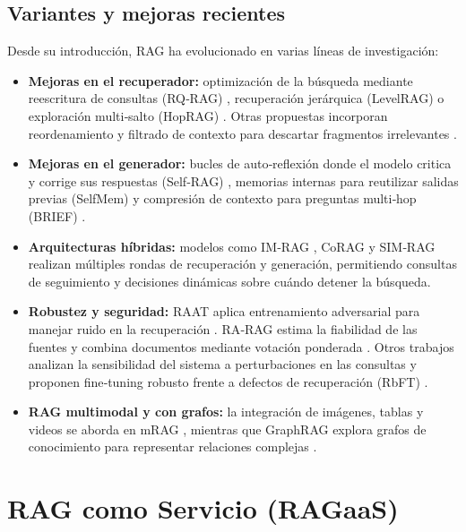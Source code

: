 \subsection{Variantes y mejoras recientes}

Desde su introducción, RAG ha evolucionado en varias líneas de investigación:

\begin{itemize}
  \item \textbf{Mejoras en el recuperador:} optimización de la búsqueda mediante reescritura de consultas (RQ‑RAG) \cite{Chan2024RQ-RAG}, recuperación jerárquica (LevelRAG) \cite{Zhang2025LevelRAG} o exploración multi‑salto (HopRAG) \cite{Wang2025HopRAG}. Otras propuestas incorporan reordenamiento y filtrado de contexto para descartar fragmentos irrelevantes \cite{Wang2023FILCO}.
  \item \textbf{Mejoras en el generador:} bucles de auto‑reflexión donde el modelo critica y corrige sus respuestas (Self‑RAG) \cite{Asai2023SelfRAG}, memorias internas para reutilizar salidas previas (SelfMem) \cite{Cheng2023SelfMem} y compresión de contexto para preguntas multi‑hop (BRIEF) \cite{Li2025BRIEF}.
  \item \textbf{Arquitecturas híbridas:} modelos como IM‑RAG \cite{Yang2024IM-RAG}, CoRAG \cite{Wang2025CoRAG} y SIM‑RAG \cite{Yang2025SIM-RAG} realizan múltiples rondas de recuperación y generación, permitiendo consultas de seguimiento y decisiones dinámicas sobre cuándo detener la búsqueda.
  \item \textbf{Robustez y seguridad:} RAAT aplica entrenamiento adversarial para manejar ruido en la recuperación \cite{Fang2024RAAT}. RA‑RAG estima la fiabilidad de las fuentes y combina documentos mediante votación ponderada \cite{Hwang2025RARAG}. Otros trabajos analizan la sensibilidad del sistema a perturbaciones en las consultas \cite{Percin2025RobustnessQuery} y proponen fine‑tuning robusto frente a defectos de recuperación (RbFT) \cite{Tu2025RbFT}.
  \item \textbf{RAG multimodal y con grafos:} la integración de imágenes, tablas y videos se aborda en mRAG \cite{Drushchak2025mRAG}, mientras que GraphRAG explora grafos de conocimiento para representar relaciones complejas \cite{Han2025GraphRAG}.
\end{itemize}

\section{RAG como Servicio (RAGaaS)}

